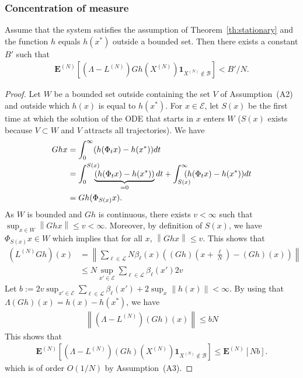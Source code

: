 \documentclass[sigconf]{acmart}
\newcommand\XN{X^{(N)}}
\newcommand\LN{L^{(N)}}
\newcommand\E{\mathcal{E}}
\newcommand\calL{\mathcal{L}}
\newcommand\calB{\mathcal{B}}
\newcommand\espN[1]{\mathbf{E}^{(N)}\left[#1\right]}
\newcommand\norm[1]{\left\|#1\right\|}
\newcommand\p[1]{\left(#1\right)}
\begin{document}
\subsubsection{Concentration of measure}

\begin{lemma}\label{lem:proof_ss2} Assume that the system satisfies the
  assumption of Theorem~\ref{th:stationary} and the function $h$
  equals $h(x^*)$ outside a bounded set. Then there exists a constant
  $B'$ such that
  \begin{align*}
    \espN{(\Lambda-\LN)Gh(\XN)\mathbf{1}_{\XN\not\in\calB}}<B'/N.
  \end{align*}
\end{lemma}

\begin{proof}
  Let $W$ be a bounded set outside containing the set $V$ of
  Assumption~(A2) and outside which $h(x)$ is equal to $h(x^*)$. For
  $x\in\E$, let $S(x)$ be the first time at which the solution of the
  ODE that starts in $x$ enters $W$ ($S(x)$ exists because
  $V\subset W$ and $V$ attracts all trajectories). We have
  \begin{align*}
    Gh x &= \int_0^\infty (h(\Phi_t x) - h(x^*)) dt\\
         &=\int_0^{S(x)}\hspace{-.3cm}\underbrace{(h(\Phi_t
           x) - h(x^*))}_{=0}dt + 
           \int_{S(x)}^{\infty}\hspace{-.3cm}(h(\Phi_t x) - h(x^*))dt\\
         &=Gh(\Phi_{S(x)}x).
  \end{align*}
  As $W$ is bounded and $Gh$ is continuous, there exists $v<\infty$
  such that $\sup_{x\in W}\norm{Ghx}\le v<\infty$. Moreover, by
  definition of $S(x)$, we have $\Phi_{S(x)}x\in W$ which implies that
  for all $x$, $\norm{Ghx}\le v$.  This shows that
  \begin{align*}
    (\LN Gh)(x) &= \norm{\sum_{\ell\in\calL}
                  N\beta_\ell(x)\p{(Gh)(x+\frac{\ell}{N})-(Gh)(x)}}\\
                &\le N \sup_{x'\in\E}\sum_{\ell\in\calL}\beta_\ell(x')
                  2v
  \end{align*}
  Let
  $b:=2v\sup_{x'\in\E}\sum_{\ell\in\calL}\beta_\ell(x')+2\sup_{x}\norm{h(x)}<\infty$. By
  using that $\Lambda(Gh)(x)=h(x)-h(x^*)$, we have
  \begin{align*}
    \norm{(\Lambda- \LN)(Gh)(x)} \le bN
  \end{align*}
  This shows that 
  \begin{align*}
    \espN{ (\Lambda-\LN)(Gh)(\XN)\mathbf{1}_{\XN\not\in\calB}}
    \le \espN{Nb}. 
  \end{align*}
  which is of order $O(1/N)$ by Assumption~(A3).
\end{proof}
\end{document}
